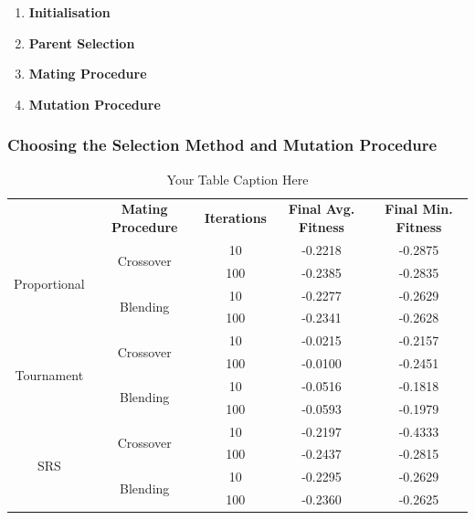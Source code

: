 \documentclass[10pt]{article}
\begin{document}
\begin{multicols}{2}
\begin{enumerate}
    \item \textbf{Initialisation}
    \item \textbf{Parent Selection} 
    \item \textbf{Mating Procedure}
    \item \textbf{Mutation Procedure}
\end{enumerate}
\end{multicols}

\subsubsection{Choosing the Selection Method and Mutation Procedure}
\label{sec:CGA_selection_mutation}

\begin{table}[H]
    \centering
    \begin{tabular}{|*{5}{c|}}
        \hline
        \renewcommand{\arraystretch}{1.5}
        \multirow{2}{*}{\textbf{Selection Method}} & \multirow{2}{*}{\textbf{Mating Procedure}} & \multirow{2}{*}{\textbf{Iterations}} & \multirow{2}{*}{\textbf{Final Avg. Fitness}} & \multirow{2}{*}{\textbf{Final Min. Fitness}} \\
        & & & & \\
        \hline
        \multirow{4}{*}{Proportional} & \multirow{2}{*}{Crossover} & 10 & -0.2218 & -0.2875 \\
        & &\cellcolor{lightgray} 100 &\cellcolor{lightgray} -0.2385 &\cellcolor{lightgray} -0.2835 \\
        \cline{2-5}
        & \multirow{2}{*}{Blending} & 10 & -0.2277 & -0.2629 \\
        & &\cellcolor{lightgray} 100 &\cellcolor{lightgray} -0.2341 & \cellcolor{lightgray} -0.2628 \\
        \hline
        \multirow{4}{*}{Tournament} & \multirow{2}{*}{Crossover} & 10 & -0.0215 & -0.2157 \\
        & &\cellcolor{lightgray} 100 &\cellcolor{lightgray} -0.0100 &\cellcolor{lightgray} -0.2451 \\
        \cline{2-5}
        & \multirow{2}{*}{Blending} & 10 & -0.0516 & -0.1818 \\
        & &\cellcolor{lightgray} 100 &\cellcolor{lightgray} -0.0593 &\cellcolor{lightgray} -0.1979 \\
        \hline
        \multirow{4}{*}{SRS} & \multirow{2}{*}{Crossover} & 10 & -0.2197 & -0.4333 \\
        & &\cellcolor{lightgray} 100 &\cellcolor{lightgray} -0.2437 &\cellcolor{lightgray} -0.2815 \\
        \cline{2-5}
        & \multirow{2}{*}{Blending} & 10 & -0.2295 & -0.2629 \\
        & &\cellcolor{lightgray} 100 &\cellcolor{lightgray} -0.2360 &\cellcolor{lightgray} -0.2625 \\
        \hline
    \end{tabular}
    \caption{Your Table Caption Here}
    \label{tab:mytable}
\end{table}
\end{document}
